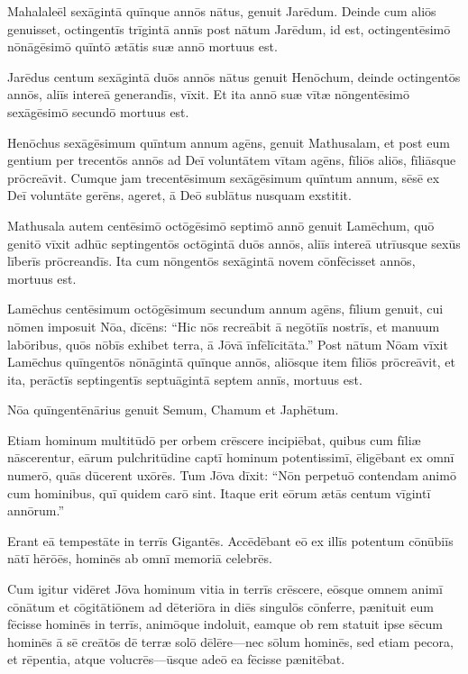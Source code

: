 \Versus Mahalaleēl sexāgintā quīnque annōs nātus, genuit Jarēdum.
\Versus Deinde cum aliōs genuisset, octingentīs trīgintā annīs post nātum Jarēdum,
\Versus id est, octingentēsimō nōnāgēsimō quīntō ætātis suæ annō mortuus est.

\Versus Jarēdus centum sexāgintā duōs annōs nātus genuit Henōchum,
\Versus deinde octingentōs annōs, aliīs intereā generandīs, vīxit.
\Versus Et ita annō suæ vītæ nōngentēsimō sexāgēsimō secundō mortuus est.

\Versus Henōchus sexāgēsimum quīntum annum agēns, genuit Mathusalam,
\Versus et post eum gentium per trecentōs annōs ad Deī voluntātem vītam agēns, fīliōs aliōs, fīliāsque prōcreāvit.
\Versus Cumque jam trecentēsimum sexāgēsimum quīntum annum,
\Versus sēsē ex Deī voluntāte gerēns, ageret, ā Deō sublātus nusquam exstitit.

\Versus Mathusala autem centēsimō octōgēsimō septimō annō genuit Lamēchum,
\Versus quō genitō vīxit adhūc septingentōs octōgintā duōs annōs, aliīs intereā utrīusque sexūs līberīs prōcreandīs.
\Versus Ita cum nōngentōs sexāgintā novem cōnfēcisset annōs, mortuus est.

\Versus Lamēchus centēsimum octōgēsimum secundum annum agēns, fīlium genuit,
\Versus cui nōmen imposuit Nōa, dīcēns: ``Hic nōs recreābit ā negōtiīs nostrīs, et manuum labōribus, quōs nōbīs exhibet terra, ā Jōvā īnfēlīcitāta.''
\Versus Post nātum Nōam vīxit Lamēchus quīngentōs nōnāgintā quīnque annōs, aliōsque item fīliōs prōcreāvit,
\Versus et ita, perāctīs septingentīs septuāgintā septem annīs, mortuus est.

\Versus Nōa quīngentēnārius genuit Semum, Chamum et Japhētum.



\Caput
\Versus Etiam hominum multitūdō per orbem crēscere incipiēbat, quibus cum fīliæ nāscerentur,
\Versus eārum pulchritūdine captī hominum potentissimī, ēligēbant ex omnī numerō, quās dūcerent uxōrēs.
\Versus Tum Jōva dīxit: ``Nōn perpetuō contendam animō cum hominibus, quī quidem carō sint. Itaque erit eōrum ætās centum vīgintī annōrum.''

\Versus Erant eā tempestāte in terrīs Gigantēs. Accēdēbant eō ex illīs potentum cōnūbiīs nātī hērōēs, hominēs ab omnī memoriā celebrēs.

\Versus Cum igitur vidēret Jōva hominum vitia in terrīs crēscere, eōsque omnem animī cōnātum et cōgitātiōnem ad dēteriōra in diēs singulōs cōnferre,
\Versus pænituit eum fēcisse hominēs in terrīs, animōque indoluit,
\Versus eamque ob rem statuit ipse sēcum hominēs ā sē creātōs dē terræ solō dēlēre—nec sōlum hominēs, sed etiam pecora, et rēpentia, atque volucrēs—ūsque adeō ea fēcisse pænitēbat.

